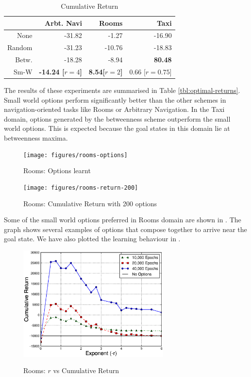\begin{table}
 \centering
 \begin{tabular}{ r | r r r }
             & Arbt. Navi           & Rooms               & Taxi                  \\ \hline
   None      & -31.82               &  -1.27              & -16.90                \\
   Random    & -31.23               & -10.76              & -18.83                \\
   Betw.     & -18.28               & -8.94               &  {\bf 80.48}          \\
   Sm-W      & {\bf -14.24 [$r=4$]} & {\bf 8.54[$r=2$]}   &   0.66 [$r=0.75$]     \\
 \end{tabular}
 \caption{Cumulative Return}
 \label{tbl:optimal-returns}
\end{table}

The results of these experiments are summarised in
Table \autoref{tbl:optimal-returns}. Small world options perform significantly
better than the other schemes in navigation-oriented tasks like Rooms or
Arbitrary Navigation. In the Taxi domain, options generated by the
betweenness scheme outperform the small world options. This is expected
because the goal states in this domain lie at betweenness maxima.

\begin{figure}[th]
  \centering
    \texttt{[image: figures/rooms-options]}
    \label{fig:rooms-options}
    \caption{Rooms: Options learnt}
\end{figure}

\begin{figure}[th]
  \centering
    \texttt{[image: figures/rooms-return-200]}
    \label{fig:rooms-return}
    \caption{Rooms: Cumulative Return with 200 options}
\end{figure}

Some of the small world options preferred in Rooms domain are shown in
. The graph shows several examples of options
that compose together to arrive near the goal state. We have also
plotted the learning behaviour in . 

\begin{figure}[th]
  \centering
      \includegraphics[width=3in]{figures/rooms-exp}
      \label{fig:rooms-exp}
    \caption{Rooms: $r$ vs Cumulative Return}
\end{figure}

